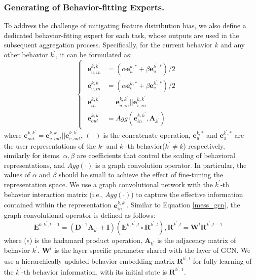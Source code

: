 \subsubsection{Generating of Behavior-fitting Experts.}
To address the challenge of mitigating feature distribution bias, we also define a dedicated behavior-fitting expert for each task, whose outputs are used in the subsequent aggregation process. Specifically, for the current behavior $k$ and any other behavior $k^{\prime}$, it can be formulated as:
\begin{equation}
\left\{\begin{array}{c}
\begin{aligned}
\mathbf{e}_{u,in}^{k, k^{\prime}}&=(\alpha \mathbf{e}_u^{k,*}+\beta \mathbf{e}_u^{k^{\prime},*})/2\\
\mathbf{e}_{v,in}^{k, k^{\prime}}&=(\alpha \mathbf{e}_v^{k,*}+\beta \mathbf{e}_v^{k^{\prime},*})/2\\
\mathbf{e}_{in}^{k, k^{\prime}} &= \mathbf{e}_{u,in}^{k, k^{\prime}}||\mathbf{e}_{v,in}^{k, k^{\prime}}\\
\mathbf{e}_{out}^{k, k^{\prime}} &= Agg(\mathbf{e}_{in}^{k, k^{\prime}}, \mathbf{A}_{k^{\prime}})
\end{aligned}
\end{array}\right.
\end{equation}
where $\mathbf{e}_{out}^{k, k^{\prime}} = \mathbf{e}_{u,out}^{k, k^{\prime}}||\mathbf{e}_{v,out}^{k, k^{\prime}}$, $(||)$ is the concatenate operation, $\mathbf{e}_u^{k,*}$ and $\mathbf{e}_u^{k^{\prime},*}$ are the user representations of the $k$- and $k^{\prime}$-th behavior($k^{\prime} \neq k$) respectively, similarly for items. $\alpha, \beta$ are coefficients that control the scaling of behavioral representations, and $Agg(\cdot)$ is a graph convolution operator. In particular, the values of $\alpha$ and $\beta$ should be small to achieve the effect of fine-tuning the representation space. We use a graph convolutional network with the $k^{\prime}$-th behavior interaction matrix (i.e., $Agg(\cdot)$) to capture the effective information contained within the representation $\mathbf{e}_{in}^{k, k^{\prime}}$. Similar to Equation \ref{mess_gcn}, the graph convolutional operator is defined as follows:
\begin{equation}
\mathbf{E}^{k, k^{\prime}, l+1}=(\mathbf{D}^{-1}\mathbf{A}_{k^{\prime}} + \mathbf{I})(\mathbf{E}^{k,k^{\prime}, l}\circ\mathbf{R}^{k^{\prime},l}),\mathbf{R}^{k^{\prime},l}=\mathbf{W}^{l}\mathbf{R}^{k^{\prime},l - 1}
\end{equation}
where ($\circ$) is the hadamard product operation, $\mathbf{A}_{k^{\prime}}$ is the adjacency matrix of behavior $k^{\prime}$. $\mathbf{W}^{l}$ is the layer specific parameter shared with the layer of GCN. We use a hierarchically updated behavior embedding matrix $\mathbf{R}^{k^{\prime},l}$ for fully learning of the $k^{\prime}$-th behavior information, with its initial state is $\mathbf{R}^{k^{\prime},1}$.


